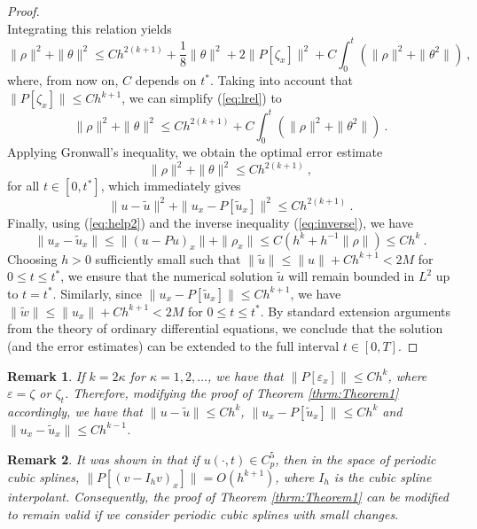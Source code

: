 \documentclass{amsart}
\newtheorem{remark}{Remark}[section]
\begin{document}
\begin{proof}
\begin{equation}
\end{equation}
%
Integrating this relation yields 
\begin{equation}\label{eq:lrel}
\|\rho\|^2+\|\theta\|^2\leq C h^{2(k+1)} + \frac{1}{8}\|\theta\|^2+2\|P[\zeta_x]\|^2 + C\int_0^t (\|\rho\|^2+\|\theta^2\|)\ ,
\end{equation}
where, from now on, $C$ depends on $t^\ast$.
Taking into account that $\|P[\zeta_x]\|\leq C h^{k+1}$, we can simplify (\ref{eq:lrel}) to
\begin{equation}
\|\rho\|^2+\|\theta\|^2\leq Ch^{2(k+1)}+C\int_0^t (\|\rho\|^2+\|\theta^2\|)\ .
\end{equation}
%
Applying Gronwall's inequality, we obtain the optimal error estimate
\begin{equation}\label{eq:help2}
\|\rho\|^2+\|\theta\|^2\leq Ch^{2(k+1)}\ ,
\end{equation}
for all $t\in [0,t^\ast]$, which immediately gives
\begin{equation}
\|u-\tilde{u}\|^2+\|u_x-P[\tilde{u}_x]\|^2\leq Ch^{2(k+1)}\ .
\end{equation}
%
Finally, using (\ref{eq:help2}) and the inverse inequality (\ref{eq:inverse}), we have 
$$\|u_x-\tilde{u}_x\|\leq \|(u-Pu)_x\|+\|\rho_x\|\leq C(h^k+h^{-1}\|\rho\|)\leq Ch^k\ .$$
%
Choosing $h>0$ sufficiently small such that $\|\tilde{u}\|\leq \|u\|+Ch^{k+1}<2M$ for $0\leq t\leq t^\ast$, 
we ensure that the numerical solution $\tilde{u}$ will remain bounded in $L^2$ up to $t=t^\ast$. Similarly, since $\|u_x-P[\tilde{u}_x]\|\leq Ch^{k+1}$, we have 
$\|\tilde{w}\|\leq \|u_x\|+Ch^{k+1}<2M$ for $0\leq t\leq t^\ast$.
By standard extension arguments from the theory of ordinary differential equations, we conclude that the solution (and the error estimates) can be extended to the full interval $t\in[0,T]$. 
\end{proof}

\begin{remark}\label{rmk:Theorem1}
If $k=2\kappa$ for $\kappa=1,2,\dots$, we have that $\|P[\varepsilon_x]\|\leq C h^{k}$, where $\varepsilon = \zeta$ or $\zeta_t$. Therefore, modifying the proof of Theorem \ref{thrm:Theorem1} accordingly, we have that 
$\|u-\tilde{u}\|\leq C h^{k}$, $\|u_x-P[\tilde{u}_x]\|\leq C h^{k}$ and $\|u_x-\tilde{u}_x\|\leq C h^{k-1}$.
\end{remark}

\begin{remark}
It was shown in \cite{AD2013} that if $u(\cdot,t)\in C^{5}_p$, then in the space of periodic cubic splines, $\|P[(v-I_h v)_x]\|=O(h^{k+1})$, where $I_h$ is the cubic spline interpolant. Consequently, the proof of Theorem \ref{thrm:Theorem1} can be modified to remain valid if we consider periodic cubic splines with small changes.
\end{remark}
\end{document}
